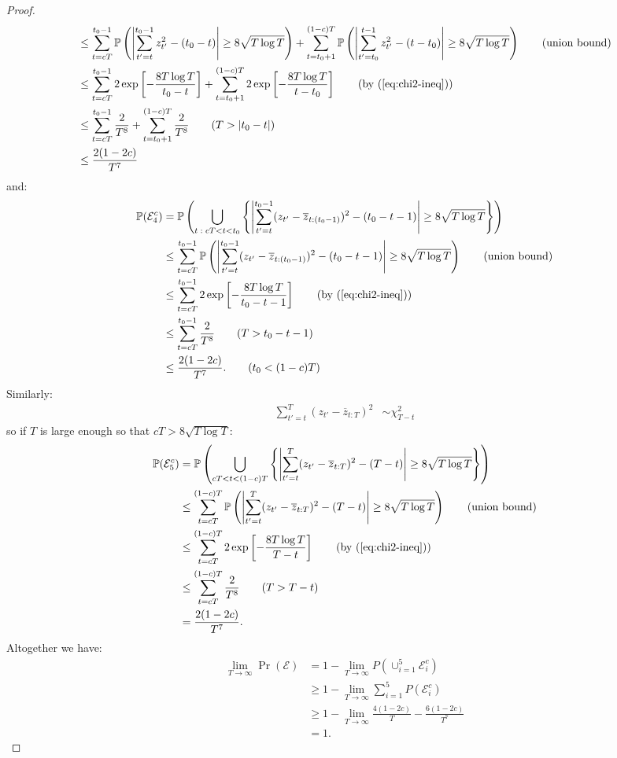 \begin{proof}
\begin{align*}
    &\leq \sum_{t = cT}^{t_0 - 1} \Pr\left(\left|\sum_{t'=t}^{t_0-1} z^2_{t'} - (t_0-t)\right| \geq 8\sqrt{T \log T} \right) + \sum_{t = t_0+1}^{(1-c)T} \Pr\left(\left|\sum_{t'=t_0}^{t-1} z^2_{t'} - (t-t_0)\right| \geq 8\sqrt{T \log T} \right) \tag{union bound} \\
    &\leq \sum_{t = cT}^{t_0 - 1} 2 \exp\left[- \frac{8 T \log T}{t_0-t} \right] + \sum_{t = t_0+1}^{(1-c)T} 2 \exp\left[-  \frac{8 T \log T}{t-t_0} \right] \tag{by (\ref{eq:chi2-ineq})} \\
    &\leq \sum_{t = cT}^{t_0 - 1} \frac{2}{T^8} + \sum_{t = t_0+1}^{(1-c)T} \frac{2}{T^8} \tag{$T > |t_0 - t|$} \\
    &\leq \frac{2(1-2c)}{T^7}
\end{align*}
\normalsize
and:
\small
\begin{align*}
    \Pr(\mathcal{E}^c_4) &= \Pr\left(\bigcup_{t \;:\; cT < t < t_0}  \left\{\left|\sum_{t'=t}^{t_0-1} (z_{t'} - \overline{z}_{t:(t_0-1)})^2- (t_0 -t - 1)\right| \geq 8\sqrt{T \log T}\right\}\right) \\
    &\leq \sum_{t = cT}^{t_0 - 1} \Pr\left( \left|\sum_{t'=t}^{t_0-1} (z_{t'} - \overline{z}_{t:(t_0-1)})^2- (t_0 -t - 1)\right| \geq 8\sqrt{T \log T} \right) \tag{union bound} \\
    &\leq \sum_{t = cT}^{t_0 - 1} 2 \exp\left[- \frac{8 T \log T}{t_0-t-1} \right] \tag{by (\ref{eq:chi2-ineq})} \\
    &\leq \sum_{t = cT}^{t_0 - 1} \frac{2}{T^8} \tag{$T > t_0 - t - 1$} \\
    &\leq \frac{2(1-2c)}{T^7}. \tag{$t_0 < (1-c)T$}
\end{align*}
\normalsize
Similarly:
\begin{align*}
    \sum_{t'=t}^T (z_{t'} - \overline{z}_{t:T})^2 &\sim \chi^2_{T-t}
\end{align*}
so if $T$ is large enough so that $cT > 8\sqrt{T\log T}$:
\small
\begin{align*}
    \Pr(\mathcal{E}^c_5) &= \Pr\left(\bigcup_{cT < t < (1-c) T} \left\{\left|\sum_{t'=t}^T (z_{t'} - \overline{z}_{t:T})^2 - (T-t)\right| \geq 8\sqrt{T \log T}\right\}\right) \\
    &\leq \sum_{t=cT}^{(1-c)T} \Pr\left(\left|\sum_{t'=t}^T (z_{t'} - \overline{z}_{t:T})^2 - (T-t)\right| \geq 8\sqrt{T \log T}\right) \tag{union bound} \\
    &\leq \sum_{t=cT}^{(1-c)T} 2 \exp\left[-\frac{8 T \log T}{T-t} \right] \tag{by (\ref{eq:chi2-ineq})} \\
    &\leq \sum_{t=cT}^{(1-c)T} \frac{2}{T^8} \tag{$T > T-t$} \\
    &= \frac{2(1-2c)}{T^7}.
\end{align*}
\normalsize
Altogether we have:
\begin{align*}
    \lim_{T\to\infty}\Pr(\mathcal{E}) &= 1 - \lim_{T\to\infty}P(\cup_{i=1}^5\mathcal{E}_i^c) \\
    &\geq 1 - \lim_{T\to\infty}\sum_{i=1}^5 P(\mathcal{E}_i^c) \tag{union bound} \\
    &\geq 1 - \lim_{T\to\infty}\frac{4(1-2c)}{T} - \frac{6(1-2c)}{T^7} \\
    &=1.
\end{align*}
\end{proof}